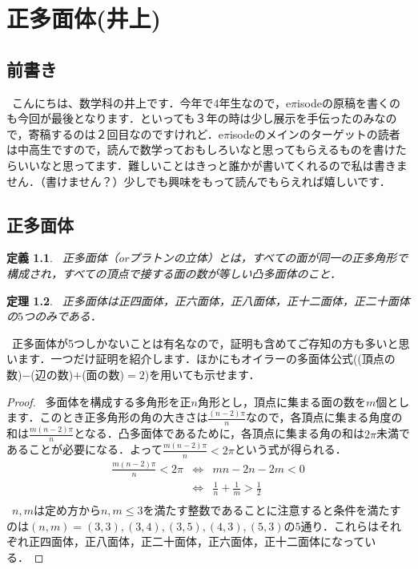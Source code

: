 \documentclass{jreport}
\theoremstyle{idefinition}
\newtheorem{idefi}{定義}[section]
\newtheorem{ithm}[idefi]{定理}
\begin{document}
\chapter{正多面体(井上)}

\section{前書き}
\ こんにちは、数学科の井上です．今年で4年生なので，e$\pi$isodeの原稿を書くのも今回が最後となります．といっても３年の時は少し展示を手伝ったのみなので，寄稿するのは２回目なのですけれど．e$\pi$isodeのメインのターゲットの読者は中高生ですので，読んで数学っておもしろいなと思ってもらえるものを書けたらいいなと思ってます．難しいことはきっと誰かが書いてくれるので私は書きません．（書けません？）少しでも興味をもって読んでもらえれば嬉しいです．\\

\section{正多面体}
\begin{idefi}
\ 正多面体（orプラトンの立体）とは，すべての面が同一の正多角形で構成され，すべての頂点で接する面の数が等しい凸多面体のこと．
\end{idefi}

\begin{ithm}
\ 正多面体は正四面体，正六面体，正八面体，正十二面体，正二十面体の$5$つのみである．
\end{ithm}

\ 正多面体が5つしかないことは有名なので，証明も含めてご存知の方も多いと思います．一つだけ証明を紹介します．ほかにもオイラーの多面体公式((頂点の数)$-$(辺の数)$+$(面の数)$=2$)を用いても示せます．\\

\begin{proof}
\ 多面体を構成する多角形を正$n$角形とし，頂点に集まる面の数を$m$個とします．このとき正多角形の角の大きさは$\frac{(n-2)\pi}{n}$なので，各頂点に集まる角度の和は$\frac{m(n-2)\pi}{n}$となる．凸多面体であるために，各頂点に集まる角の和は$2\pi$未満であることが必要になる．よって$\frac{m(n-2)\pi}{n}<2\pi$という式が得られる．
\[
\begin{array}{ccc}
\frac{m(n-2)\pi}{n}<2\pi & \Longleftrightarrow & mn-2n-2m<0 \\
& \Longleftrightarrow & \frac{1}{n}+\frac{1}{m}>\frac{1}{2}\\
\end{array}
\]
\ $n,m$は定め方から$n,m\leq3$を満たす整数であることに注意すると条件を満たすのは$(n,m)=(3,3),(3,4),(3,5),(4,3),(5,3)$の$5$通り．これらはそれぞれ正四面体，正八面体，正二十面体，正六面体，正十二面体になっている．
\end{proof}
\end{document}
